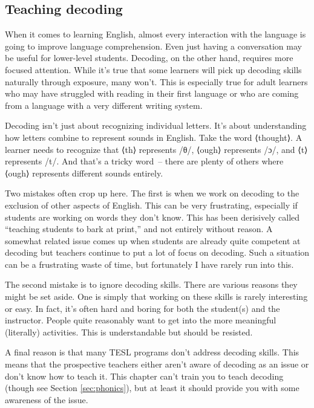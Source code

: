 \subsection{Teaching decoding}

When it comes to learning English, almost every interaction with the language is going to improve language comprehension. Even just having a conversation may be useful for lower-level students. Decoding, on the other hand, requires more focused attention. While it's true that some learners will pick up decoding skills naturally through exposure, many won't. This is especially true for adult learners who may have struggled with reading in their first language or who are coming from a language with a very different writing system.

Decoding isn't just about recognizing individual letters. It's about understanding how letters combine to represent sounds in English. Take the word ⟨thought⟩. A learner needs to recognize that ⟨th⟩ represents /θ/, ⟨ough⟩ represents /ɔ/, and ⟨t⟩ represents /t/. And that's a tricky word~-- there are plenty of others where ⟨ough⟩ represents different sounds entirely.

Two mistakes often crop up here. The first is when we work on decoding to the exclusion of other aspects of English. This can be very frustrating, especially if students are working on words they don't know. This has been derisively called ``teaching students to bark at print,'' and not entirely without reason. A somewhat related issue comes up  when students are already quite competent at decoding but teachers continue to put a lot of focus on decoding. Such a situation can be a frustrating waste of time, but fortunately I have rarely run into this.

The second mistake is to ignore decoding skills. There are various reasons they might be set aside. One is simply that working on these skills is rarely interesting or easy. In fact, it's often hard and boring for both the student(s) and the instructor. People quite reasonably want to get into the more meaningful (literally) activities. This is understandable but should be resisted.

A final reason is that many TESL programs don't address decoding skills. This means that the prospective teachers either aren't aware of decoding as an issue or don't know how to teach it. This chapter can't train you to teach decoding (though see Section \ref{sec:phonics}), but at least it should provide you with some awareness of the issue.

